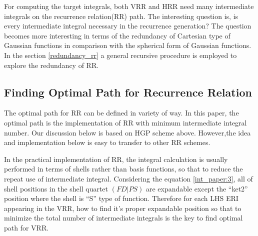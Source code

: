 For computing the target integrals, both VRR and HRR need many intermediate integrals on
the recurrence relation(RR) path. The interesting question is, is every intermediate integral 
necessary in the recurrence generation? The question becomes more interesting in terms of 
the redundancy of Cartesian type of Gaussian functions in comparison with the spherical form of 
Gaussian functions. In the section \ref{redundancy_rr} a general recursive procedure is 
employed to explore the redundancy of RR.


\subsection{Finding Optimal Path for Recurrence Relation}
\label{optimal_path}

The optimal path for RR can be defined in variety of way. In this paper,
the optimal path is the implementation of RR with minimum intermediate integral
number. Our discussion below is based on HGP scheme above. However,the idea 
and implementation below is easy to transfer to other RR schemes.

In the practical implementation of RR, the integral calculation is usually performed 
in terms of shells rather than basis functions, so that to reduce the repeat use of 
intermediate integral. Considering the equation \ref{int_paper:3}, 
all of shell positions in the shell quartet $(FD|PS)$ are expandable except the ``ket2'' position 
where the shell is ``S'' type of 
function. Therefore for each LHS ERI appearing in the VRR, how to find it's proper expandable
position so that to minimize the total number of intermediate integrals is the key to 
find optimal path for VRR.

